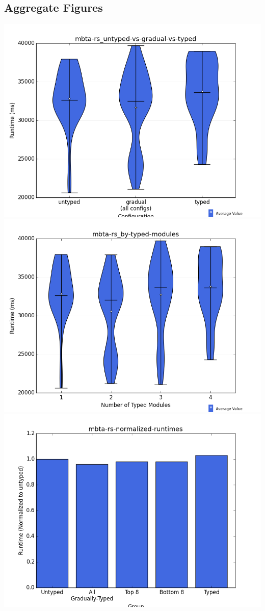 \documentclass{article}
\begin{document}
\subsection{Aggregate Figures}
\includegraphics[width=\textwidth]{mbta-rs_untyped-vs-gradual-vs-typed-violin.png}
\includegraphics[width=\textwidth]{mbta-rs_by-typed-modules-violin.png}
\includegraphics[width=\textwidth]{mbta-rs-normalized-runtimes-bar.png}
\end{document}
